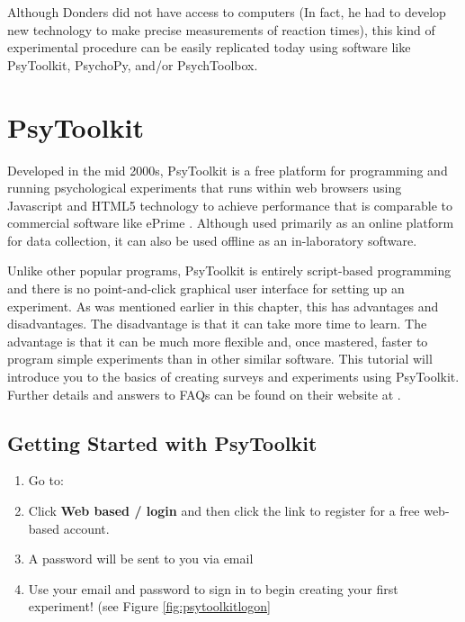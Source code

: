Although Donders did not have access to computers (In fact, he had to develop new technology to make precise measurements of reaction times), this kind of experimental procedure can be easily replicated today using software like PsyToolkit, PsychoPy, and/or PsychToolbox.

\section{PsyToolkit}
Developed in the mid 2000s, PsyToolkit is a free platform for programming and running psychological experiments that runs within web browsers using Javascript and HTML5 technology to achieve performance that is comparable to commercial software like ePrime \citep{kim2019testing}.  Although used primarily as an online platform for data collection, it can also be used offline as an in-laboratory software.

Unlike other popular programs, PsyToolkit is entirely script-based programming and there is no point-and-click graphical user interface for setting up an experiment. As was mentioned earlier in this chapter, this has advantages and disadvantages. The disadvantage is that it can take more time to learn. The advantage is that it can be much more flexible and, once mastered, faster to program simple experiments than in other similar software.  This tutorial will introduce you to the basics of creating surveys and experiments using PsyToolkit. Further details and answers to FAQs can be found on their website at .

\subsection{Getting Started with PsyToolkit}
\begin{enumerate}
    \item Go to: 
    \item Click \textbf{Web based / login} and then click the link to register for a free web-based account.
    \item A password will be sent to you via email
    \item Use your email and password to sign in to begin creating your first experiment! (see Figure \ref{fig:psytoolkitlogon}
\end{enumerate}

\begin{center}
\end{center}

